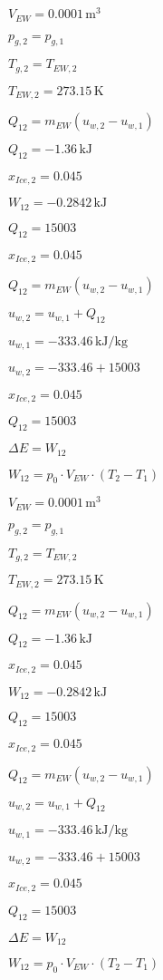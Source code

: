 \( V_{EW} = 0.0001 \, \text{m}^3 \)  

\( p_{g,2} = p_{g,1} \)  

\( T_{g,2} = T_{EW,2} \)  

\( T_{EW,2} = 273.15 \, \text{K} \)  

\( Q_{12} = m_{EW} (u_{w,2} - u_{w,1}) \)  

\( Q_{12} = -1.36 \, \text{kJ} \)  

\( x_{Ice,2} = 0.045 \)  

\( W_{12} = -0.2842 \, \text{kJ} \)  

\( Q_{12} = 15003 \)  

\( x_{Ice,2} = 0.045 \)  

\( Q_{12} = m_{EW} (u_{w,2} - u_{w,1}) \)  

\( u_{w,2} = u_{w,1} + Q_{12} \)  

\( u_{w,1} = -333.46 \, \text{kJ/kg} \)  

\( u_{w,2} = -333.46 + 15003 \)  

\( x_{Ice,2} = 0.045 \)  

\( Q_{12} = 15003 \)  

\( \Delta E = W_{12} \)  

\( W_{12} = p_0 \cdot V_{EW} \cdot (T_{2} - T_{1}) \)  

\( V_{EW} = 0.0001 \, \text{m}^3 \)  

\( p_{g,2} = p_{g,1} \)  

\( T_{g,2} = T_{EW,2} \)  

\( T_{EW,2} = 273.15 \, \text{K} \)  

\( Q_{12} = m_{EW} (u_{w,2} - u_{w,1}) \)  

\( Q_{12} = -1.36 \, \text{kJ} \)  

\( x_{Ice,2} = 0.045 \)  

\( W_{12} = -0.2842 \, \text{kJ} \)  

\( Q_{12} = 15003 \)  

\( x_{Ice,2} = 0.045 \)  

\( Q_{12} = m_{EW} (u_{w,2} - u_{w,1}) \)  

\( u_{w,2} = u_{w,1} + Q_{12} \)  

\( u_{w,1} = -333.46 \, \text{kJ/kg} \)  

\( u_{w,2} = -333.46 + 15003 \)  

\( x_{Ice,2} = 0.045 \)  

\( Q_{12} = 15003 \)  

\( \Delta E = W_{12} \)  

\( W_{12} = p_0 \cdot V_{EW} \cdot (T_{2} - T_{1}) \)  

